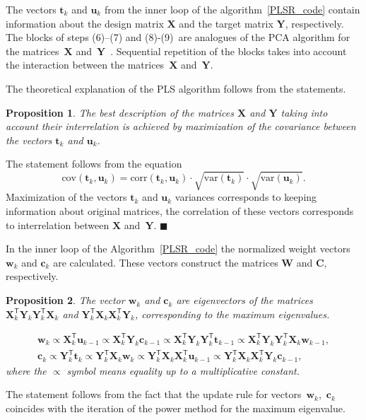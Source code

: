 \documentclass[12pt,oneside]{article}
\newtheorem{proposition}{Proposition}
\theoremstyle{definition}
\newcommand{\bw}{\mathbf{w}}
\newcommand{\bY}{\mathbf{Y}}
\newcommand{\bX}{\mathbf{X}}
\newcommand{\bu}{\mathbf{u}}
\newcommand{\bt}{\mathbf{t}}
\newcommand{\bc}{\mathbf{c}}
\newcommand{\bC}{\mathbf{C}}
\newcommand{\bW}{\mathbf{W}}
\newcommand{\T}{\mathsf{T}}
\begin{document}
The vectors $\bt_k$ and $\bu_k$ from the inner loop of the algorithm~\ref{PLSR_code} contain information about the design matrix $\bX$ and the target matrix $\bY$, respectively. 
The blocks of steps (6)--(7) and (8)-(9)~are analogues of the PCA algorithm for the matrices~$\bX$ and~$\bY$~\cite{geladi1986partial}. 
Sequential repetition of the blocks takes into account the interaction between the matrices~$\bX$ and~$\bY$.

The theoretical explanation of the PLS algorithm follows from the statements.
\begin{proposition}
	The best description of the matrices $\bX$ and $\bY$ taking into account their interrelation is achieved by maximization of the covariance between the vectors $\bt_k$ and $\bu_k$.
\end{proposition}
The statement follows from the equation
\begin{equation}
\text{cov} (\bt_k, \bu_k) = \text{corr} (\bt_k, \bu_k) \cdot \sqrt{\text{var}(\bt_k)} \cdot \sqrt{\text{var}(\bu_k)}.
\end{equation}
Maximization of the vectors $\bt_k$ and $\bu_k$ variances corresponds to keeping information about original matrices, the correlation of these vectors corresponds to interrelation between $\bX$ and~$\bY$. $\blacksquare$

In the inner loop of the Algorithm~\ref{PLSR_code} the normalized weight vectors $\bw_k$ and $\bc_k$ are calculated. 
These vectors construct the matrices $\bW$ and $\bC$, respectively.

\begin{proposition}
	The vector $\bw_k$ and $\bc_k$ are eigenvectors of the matrices $\bX_k^{\T} \bY_k \bY_k^{\T} \bX_k$ and $\bY_k^{\T} \bX_k \bX_k^{\T} \bY_k$, corresponding to the maximum eigenvalues.
	
	\begin{align}
	\bw_k \varpropto \bX_k^{\T} \bu_{k-1} \varpropto \bX_k^{\T} \bY_k \bc_{k-1} \varpropto \bX_k^{\T} \bY_k \bY_k^{\T} \bt_{k-1} \varpropto \bX_k^{\T} \bY_k \bY_k^{\T} \bX_k \bw_{k-1}, \\
	\bc_k \varpropto \bY_k^{\T} \bt_k \varpropto \bY_k^{\T} \bX_k \bw_k \varpropto \bY_k^{\T} \bX_k \bX_k^{\T} \bu_{k-1} \varpropto \bY_k^{\T} \bX_k \bX_k^{\T} \bY_k \bc_{k-1},
	\end{align}
	where the $\varpropto$ symbol means equality up to a multiplicative constant.
	\label{st:eig}
\end{proposition}

The statement follows from the fact that the update rule for vectors~$\bw_k$,~$\bc_k$ coincides with the iteration of the power method for the maximum eigenvalue.
\end{document}
